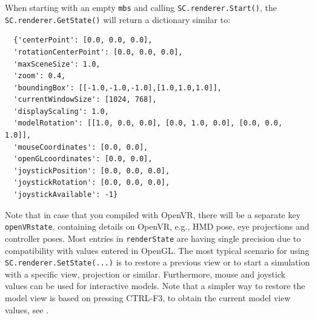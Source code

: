 When starting with an empty \texttt{mbs} and calling \texttt{SC.renderer.Start()}, the \texttt{SC.renderer.GetState()} will return a dictionary similar to:
\pythonstyle\begin{lstlisting}
  {'centerPoint': [0.0, 0.0, 0.0],
  'rotationCenterPoint': [0.0, 0.0, 0.0],
  'maxSceneSize': 1.0,
  'zoom': 0.4,
  'boundingBox': [[-1.0,-1.0,-1.0],[1.0,1.0,1.0]],
  'currentWindowSize': [1024, 768],
  'displayScaling': 1.0,
  'modelRotation': [[1.0, 0.0, 0.0], [0.0, 1.0, 0.0], [0.0, 0.0, 1.0]],
  'mouseCoordinates': [0.0, 0.0],
  'openGLcoordinates': [0.0, 0.0],
  'joystickPosition': [0.0, 0.0, 0.0],
  'joystickRotation': [0.0, 0.0, 0.0],
  'joystickAvailable': -1}
\end{lstlisting}
Note that in case that you compiled with OpenVR, there will be a separate key \texttt{openVRstate}, containing details on OpenVR, e.g., HMD pose, eye projections and controller poses.
Most entries in \texttt{renderState} are having single precision due to compatibility with values entered in OpenGL.
The most typical scenario for using \texttt{SC.renderer.SetState(...)} is to restore a previous view or to start a simulation with a specific view, projection or similar. Furthermore, mouse and joystick values can be used for interactive models.
Note that a simpler way to restore the model view is based on pressing CTRL-F3, to obtain the current model view values, see .

